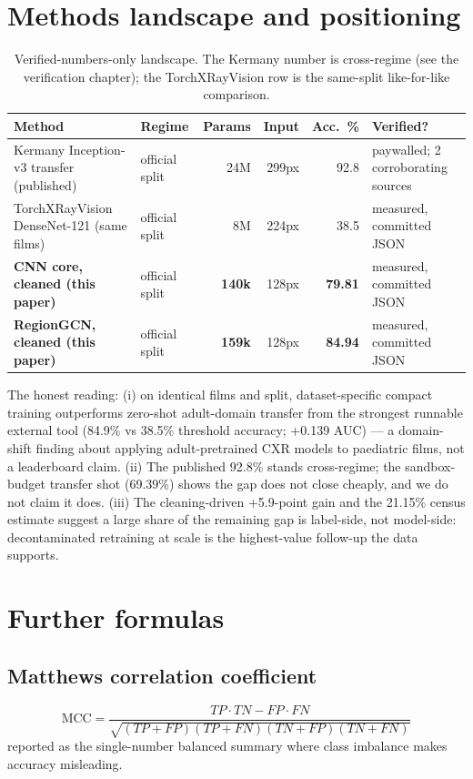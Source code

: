 
\section{Methods landscape and positioning}
\begin{table}[h]\centering\small
\begin{tabular}{p{4.6cm} p{2.4cm} r r r l}
\hline
Method & Regime & Params & Input & Acc.\ \% & Verified? \\
\hline
Kermany Inception-v3 transfer (published) & official split & 24M & 299px & 92.8 & paywalled; 2 corroborating sources \\
TorchXRayVision DenseNet-121 (same films) & official split & 8M & 224px & 38.5 & measured, committed JSON \\
\textbf{CNN core, cleaned (this paper)} & official split & \textbf{140k} & 128px & \textbf{79.81} & measured, committed JSON \\
\textbf{RegionGCN, cleaned (this paper)} & official split & \textbf{159k} & 128px & \textbf{84.94} & measured, committed JSON \\
\hline
\end{tabular}
\caption{Verified-numbers-only landscape. The Kermany number is
cross-regime (see the verification chapter); the TorchXRayVision row is
the same-split like-for-like comparison.}
\label{tab:landscape}
\end{table}
The honest reading: (i) on identical films and split, dataset-specific compact training outperforms zero-shot adult-domain transfer from the strongest runnable external tool (84.9\% vs 38.5\% threshold accuracy; +0.139 AUC) --- a domain-shift finding about applying adult-pretrained CXR models to paediatric films, not a leaderboard claim. (ii) The published 92.8\% stands
cross-regime; the sandbox-budget transfer shot (69.39\%) shows the gap
does not close cheaply, and we do not claim it does. (iii) The
cleaning-driven +5.9-point gain and the 21.15\% census estimate suggest a
large share of the remaining gap is label-side, not model-side: decontaminated
retraining at scale is the highest-value follow-up the data supports.

\section{Further formulas}
\subsection{Matthews correlation coefficient}
\begin{equation}
\mathrm{MCC} = \frac{TP \cdot TN - FP \cdot FN}
{\sqrt{(TP+FP)(TP+FN)(TN+FP)(TN+FN)}}
\end{equation}
reported as the single-number balanced summary where class imbalance
makes accuracy misleading.
